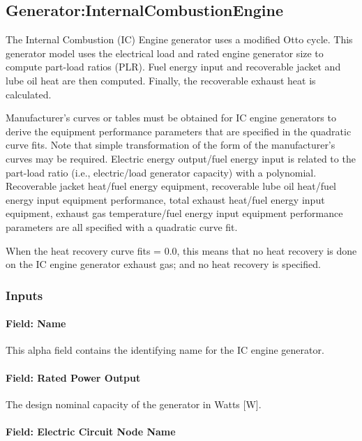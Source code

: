 \subsection{Generator:InternalCombustionEngine}\label{generatorinternalcombustionengine}

The Internal Combustion (IC) Engine generator uses a modified Otto cycle. This generator model uses the electrical load and rated engine generator size to compute part-load ratios (PLR). Fuel energy input and recoverable jacket and lube oil heat are then computed. Finally, the recoverable exhaust heat is calculated.

Manufacturer's curves or tables must be obtained for IC engine generators to derive the equipment performance parameters that are specified in the quadratic curve fits. Note that simple transformation of the form of the manufacturer's curves may be required. Electric energy output/fuel energy input is related to the part-load ratio (i.e., electric/load generator capacity) with a polynomial. Recoverable jacket heat/fuel energy equipment, recoverable lube oil heat/fuel energy input equipment performance, total exhaust heat/fuel energy input equipment, exhaust gas temperature/fuel energy input equipment performance parameters are all specified with a quadratic curve fit.

When the heat recovery curve fits = 0.0, this means that no heat recovery is done on the IC engine generator exhaust gas; and no heat recovery is specified.

\subsubsection{Inputs}\label{inputs-7-007}

\paragraph{Field: Name}\label{field-name-8-004}

This alpha field contains the identifying name for the IC engine generator.

\paragraph{Field: Rated Power Output}\label{field-rated-power-output}

The design nominal capacity of the generator in Watts {[}W{]}.

\paragraph{Field: Electric Circuit Node Name}\label{field-electric-circuit-node-name}

